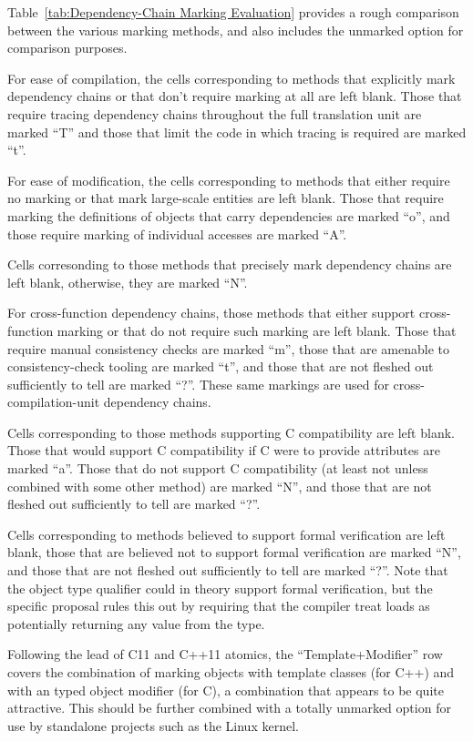 \documentclass[letterpaper,10pt]{article}
\begin{document}
Table~\ref{tab:Dependency-Chain Marking Evaluation}
provides a rough comparison between the various marking methods, and
also includes the unmarked option for comparison purposes.

For ease of compilation, the cells corresponding to methods that
explicitly mark dependency chains or that don't require marking at all
are left blank.
Those that require tracing dependency chains throughout the full
translation unit are marked ``T'' and those that limit the code in
which tracing is required are marked ``t''.

For ease of modification, the cells corresponding to methods that
either require no marking or that mark large-scale entities are
left blank.
Those that require marking the definitions of objects that carry
dependencies are marked ``o'', and those require marking of individual
accesses are marked ``A''.

Cells corresonding to those methods that precisely mark dependency chains are 
left blank, otherwise, they are marked ``N''.

For cross-function dependency chains, those methods that either support
cross-function marking or that do not require such marking are left blank.
Those that require manual consistency checks are marked ``m'', those
that are amenable to consistency-check tooling are marked ``t'', and
those that are not fleshed out sufficiently to tell are marked ``?''.
These same markings are used for cross-compilation-unit dependency
chains.

Cells corresponding to those methods supporting C compatibility are left
blank.
Those that would support C compatibility if C were to provide attributes
are marked ``a''.
Those that do not support C compatibility (at least not unless combined
with some other method) are marked ``N'',
and those that are not fleshed out sufficiently to tell are marked ``?''.

Cells corresponding to methods believed to support formal verification
are left blank, those that are believed not to support formal verification
are marked ``N'',
and those that are not fleshed out sufficiently to tell are marked ``?''.
Note that the object type qualifier could in theory support formal
verification, but the specific proposal rules this out by requiring that
the compiler treat  loads as potentially
returning any value from the type.

Following the lead of C11 and C++11 atomics, the ``Template+Modifier''
row covers the combination of
marking objects with template classes (for C++) and with an
typed object modifier (for C), a combination that appears to be quite
attractive.
This should be further combined with a totally unmarked option for
use by standalone projects such as the Linux kernel.
\end{document}
